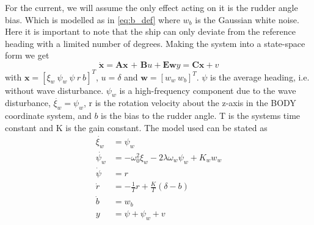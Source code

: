 For the current, we will assume the only effect acting on it is the rudder angle bias. Which is modelled as in \cref{eq:b_def} where $w_b$ is the Gaussian white noise. Here it is important to note that the ship can only deviate from the reference heading with a limited number of degrees.
\newline 
\newline
Making the system into a state-space form we get
\begin{subequations} \label{eq:state_space}
    \begin{equation}
        \dot{\textbf{x}} = \textbf{Ax + B}u + \textbf{Ew}
    \end{equation}
    \begin{equation}
        y = \textbf{Cx} + v
    \end{equation}
\end{subequations}
with $\textbf{x} = [\xi_w \ \psi_w \ \psi \ r \ b]^T$, $u = \delta$ and $\textbf{w} = [w_w \ w_b]^T$. $\psi$ is the average heading, i.e. without wave disturbance. $\psi_w$ is a high-frequency component due to the wave disturbance, $\dot{\xi_w} = \psi_w$, r is the rotation velocity about the z-axis in the BODY coordinate system, and $b$ is the bias to the rudder angle. T is the systems time constant and K is the gain constant. The model used can be stated as 
\begin{subequations}
\begin{align}
        \dot{\xi_w} &= \psi_w \label{eq:xidot_def} \\
        \dot{\psi_w} &= -\omega_0^2 \xi_w - 2\lambda \omega_w \psi_w + K_w w_w \label{eq:psidot_m} \\
        \dot{\psi} &= r \label{eq:psidot} \\
        \dot{r} &= -\frac{1}{T}r + \frac{K}{T}(\delta - b) \label{eq:rdot_def} \\
        \dot{b} &= w_b \label{eq:b_def} \\
        y &= \psi + \psi_w + v \label{eq:y_def}
\end{align}
\end{subequations}
